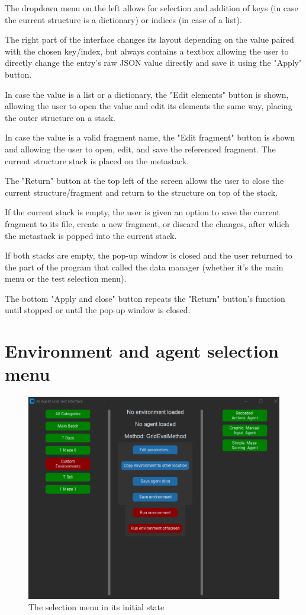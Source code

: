 \documentclass[masterthesis]{fer}
\begin{document}
The dropdown menu on the left allows for selection and addition of keys (in case the current structure is a dictionary) or indices (in case of a list).

The right part of the interface changes its layout depending on the value paired with the chosen key/index, but always contains a textbox allowing the user to directly change the entry's raw JSON value directly and save it using the "Apply" button.

In case the value is a list or a dictionary, the "Edit elements" button is shown, allowing the user to open the value and edit its elements the same way, placing the outer structure on a stack.

In case the value is a valid fragment name, the "Edit fragment" button is shown and allowing the user to open, edit, and save the referenced fragment. The current structure stack is placed on the metastack.

The "Return" button at the top left of the screen allows the user to close the current structure/fragment and return to the structure on top of the stack.

If the current stack is empty, the user is given an option to save the current fragment to its file, create a new fragment, or discard the changes, after which the metastack is popped into the current stack.

If both stacks are empty, the pop-up window is closed and the user returned to the part of the program that called the data manager (whether it's the main menu or the test selection menu).

The bottom "Apply and close" button repeats the "Return" button's function until stopped or until the pop-up window is closed.

\section{Environment and agent selection menu}
\begin{figure}[htb]
  \centering
  \includegraphics[width=0.5\linewidth]{Figures/thesis selection menu.png} 
  \caption{The selection menu in its initial state}
  \label{slk:thesis_selection_menu}
\end{figure}
\end{document}
